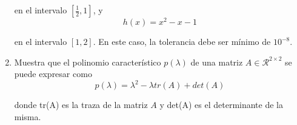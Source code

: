 \documentclass[letterpaper,11pt]{article}
\begin{document}
\begin{enumerate}
    en el intervalo $[\frac{1}{2}, 1]$, y 
    \begin{equation*}
        h(x) = x^2 - x - 1
    \end{equation*}

    en el intervalo $[1, 2]$. En este caso, la tolerancia debe ser mínimo de 
    $10^{-8}$.

    \item Muestra que el polinomio característico $p(\lambda)$ de una matriz 
    $A \in \mathcal{R}^{2 \times 2}$ se puede expresar como 
    \begin{equation*}
        p(\lambda) = \lambda^2 - \lambda tr(A) + det(A)
    \end{equation*}

    donde tr(A) es la traza de la matriz $A$ y det(A) es el determinante de la 
    misma. 


\end{enumerate}
\end{document}
